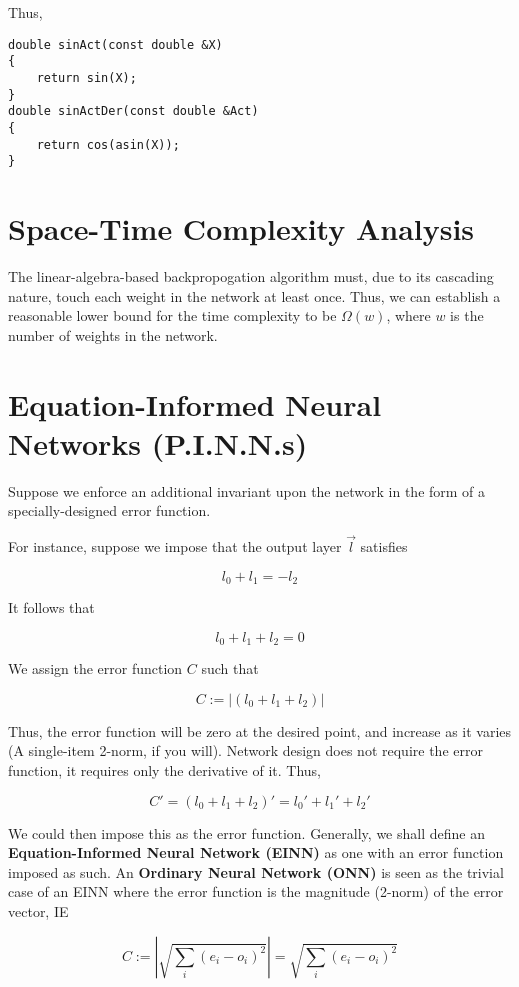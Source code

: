 \documentclass[8pt]{amsart}
\begin{document}
Thus,

\begin{verbatim}
double sinAct(const double &X)
{
    return sin(X);
}
double sinActDer(const double &Act)
{
    return cos(asin(X));
}
\end{verbatim}

\section{Space-Time Complexity Analysis}

The linear-algebra-based backpropogation algorithm must, due to its
cascading nature, touch each weight in the network at least once. Thus,
we can establish a reasonable lower bound for the time complexity to be
$\Omega (w)$, where $w$ is the number of weights in the network.

\section{Equation-Informed Neural Networks (P.I.N.N.s)}

Suppose we enforce an additional invariant upon the network in the
form of a specially-designed error function.

For instance, suppose we impose that the output layer $\vec{l}$
satisfies

\[
    l_0 + l_1 = -l_2
\]

It follows that

\[
    l_0 + l_1 + l_2 = 0
\]

We assign the error function $C$ such that

\[
    C := |(l_0 + l_1 + l_2)|
\]

Thus, the error function will be zero at the desired point,
and increase as it varies (A single-item 2-norm, if you will).
Network design does not require the error function, it requires
only the derivative of it. Thus,

\[
    C' = (l_0 + l_1 + l_2)' = l_0' + l_1' + l_2'
\]

We could then impose this as the error function. Generally,
we shall define an \textbf{Equation-Informed Neural Network (EINN)}
as one with an error function imposed as such. An \textbf{Ordinary Neural 
Network (ONN)} is seen as the trivial case of an EINN where the error
function is the magnitude (2-norm) of the error vector, IE 

\[
    C := | \sqrt{\sum_i{(e_i - o_i)^2}} | = \sqrt{\sum_i{(e_i - o_i)^2}}
\]
\end{document}

